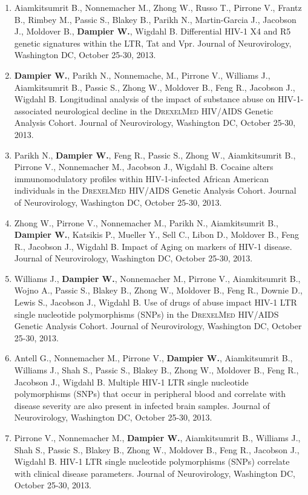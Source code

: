 \documentclass[a4paper,11pt]{article}
\begin{document}
\begin{enumerate}
\begin{itemize}
\begin{enumerate}[label=\arabic{enumii}.]
   \item Aiamkitsumrit B., Nonnemacher M., Zhong W., Russo T., Pirrone V., Frantz B., Rimbey M., Passic S., Blakey B., Parikh N., Martin-Garcia J., Jacobson J., Moldover B., \textbf{Dampier W.}, Wigdahl B. Differential HIV-1 X4 and R5 genetic signatures within the LTR, Tat and Vpr. Journal of Neurovirology, Washington DC, October 25-30, 2013.
   \item \textbf{Dampier W.}, Parikh N., Nonnemache, M., Pirrone V., Williams J., Aiamkitsumrit B., Passic S., Zhong W., Moldover B., Feng R., Jacobson J., Wigdahl B. Longitudinal analysis of the impact of substance abuse on HIV-1-associated neurological decline in the \textsc{DrexelMed} HIV/AIDS Genetic Analysis Cohort. Journal of Neurovirology, Washington DC, October 25-30, 2013.
   \item Parikh N., \textbf{Dampier W.}, Feng R., Passic S., Zhong W., Aiamkitsumrit B., Pirrone V., Nonnemacher M., Jacobson J., Wigdahl B. Cocaine alters immunomodulatory profiles within HIV-1-infected African American individuals in the \textsc{DrexelMed} HIV/AIDS Genetic Analysis Cohort. Journal of Neurovirology, Washington DC, October 25-30, 2013.
   \item Zhong W., Pirrone V., Nonnemacher M., Parikh N., Aiamkitsumrit B., \textbf{Dampier W.}, Katsikis P., Mueller Y., Sell C., Libon D., Moldover B., Feng R., Jacobson J., Wigdahl B. Impact of Aging on markers of HIV-1 disease. Journal of Neurovirology, Washington DC, October 25-30, 2013.
   \item Williams J., \textbf{Dampier W.}, Nonnemacher M., Pirrone V., Aiamkitsumrit B., Wojno A., Passic S., Blakey B., Zhong W., Moldover B., Feng R., Downie D., Lewis S., Jacobson J., Wigdahl B. Use of drugs of abuse impact HIV-1 LTR single nucleotide polymorphisms (SNPs) in the \textsc{DrexelMed} HIV/AIDS Genetic Analysis Cohort. Journal of Neurovirology, Washington DC, October 25-30, 2013.
   \item Antell G., Nonnemacher M., Pirrone V., \textbf{Dampier W.}, Aiamkitsumrit B., Williams J., Shah S., Passic S., Blakey B., Zhong W., Moldover B., Feng R., Jacobson J., Wigdahl B. Multiple HIV-1 LTR single nucleotide polymorphisms (SNPs) that occur in peripheral blood and correlate with disease severity are also present in infected brain samples. Journal of Neurovirology, Washington DC, October 25-30, 2013.
   \item Pirrone V., Nonnemacher M., \textbf{Dampier W.}, Aiamkitsumrit B., Williams J., Shah S., Passic S., Blakey B., Zhong W., Moldover B., Feng R., Jacobson J., Wigdahl B. HIV-1 LTR single nucleotide polymorphisms (SNPs) correlate with clinical disease parameters. Journal of Neurovirology, Washington DC, October 25-30, 2013.
  \end{enumerate}


\end{itemize}
\end{enumerate}
\end{document}
